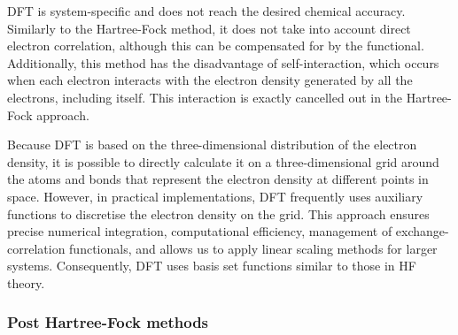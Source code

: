 \documentclass[10pt]{iopart}
\begin{document}
DFT is system-specific and does not reach the desired chemical accuracy. Similarly to the Hartree-Fock method, it does not take into account direct electron correlation, although this can be compensated for by the functional. Additionally, this method has the disadvantage of self-interaction, which occurs when each electron interacts with the electron density generated by all the electrons, including itself. This interaction is exactly cancelled out in the Hartree-Fock approach.

Because DFT is based on the three-dimensional distribution of the electron density, it is possible to directly calculate it on a three-dimensional grid around the atoms and bonds that represent the electron density at different points in space. However, in practical implementations, DFT frequently uses auxiliary functions to discretise the electron density on the grid. This approach ensures precise numerical integration, computational efficiency, management of exchange-correlation functionals, and allows us to apply linear scaling methods for larger systems. Consequently, DFT uses basis set functions similar to those in HF theory.

\subsubsection{Post Hartree-Fock methods}\hfill
\end{document}
